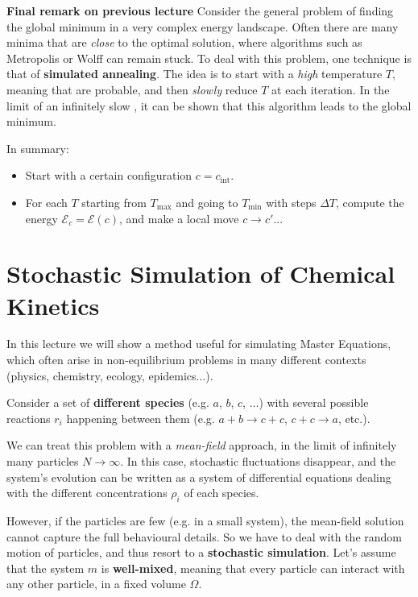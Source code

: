 \documentclass[../template.tex]{subfiles}
\begin{document}
\textbf{Final remark on previous lecture}
Consider the general problem of finding the global minimum in a very complex energy landscape. Often there are many minima that are \textit{close} to the optimal solution, where algorithms such as Metropolis or Wolff can remain stuck. To deal with this problem, one technique is that of \textbf{simulated annealing}. The idea is to start with a \textit{high} temperature $T$, meaning that  are probable, and then \textit{slowly} reduce $T$ at each iteration. In the limit of an infinitely slow , it can be shown that this algorithm leads to the global minimum.

In summary:
\begin{itemize}
    \item Start with a certain configuration $c = c_{\mathrm{int}}$.
    \item For each $T$ starting from $T_{\max}$ and going to $T_{\min}$ with steps $\Delta T$, compute the energy $\mathcal{E}_c = \mathcal{E}(c)$, and make a local move $c \to c'$...
\end{itemize} 

\section{Stochastic Simulation of Chemical Kinetics}
In this lecture we will show a method useful for simulating Master Equations, which often arise in non-equilibrium problems in many different contexts (physics, chemistry, ecology, epidemics...).

\medskip

Consider a set of \textbf{different species} (e.g. $a$, $b$, $c$, $\dots$) with several possible reactions $r_i$ happening between them (e.g. $a+b \to c+ c$, $c + c \to a$, etc.). 

We can treat this problem with a \textit{mean-field} approach, in the limit of infinitely many particles $N \to \infty$. In this case, stochastic fluctuations disappear, and the system's evolution can be written as a system of differential equations dealing with the different concentrations $\rho_i$ of each species.

\medskip

However, if the particles are few (e.g. in a small system), the mean-field solution cannot capture the full behavioural details. So we have to deal with the random motion of particles, and thus resort to a \textbf{stochastic simulation}. Let's assume that the system $m$ is \textbf{well-mixed}, meaning that every particle can interact with any other particle, in a fixed volume $\Omega$.
\end{document}
